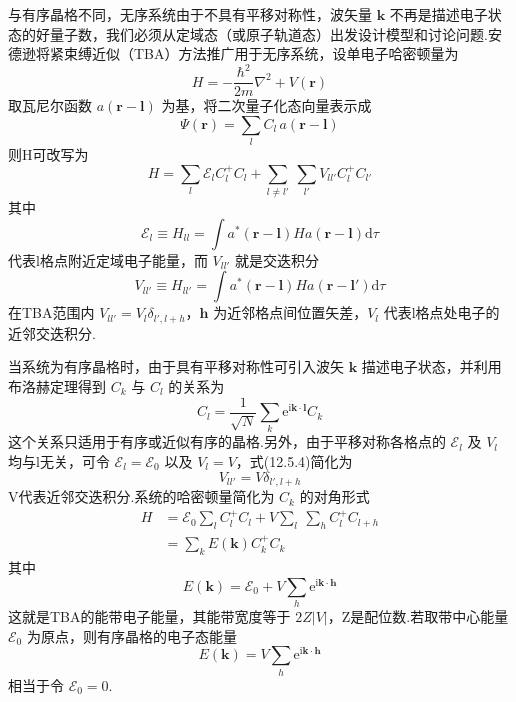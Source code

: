 与有序晶格不同，无序系统由于不具有平移对称性，波矢量 $\boldsymbol{k}$ 不再是描述电子状态的好量子数，我们必须从定域态（或原子轨道态）出发设计模型和讨论问题.安德逊将紧束缚近似（TBA）方法推广用于无序系统，设单电子哈密顿量为
\begin{equation}
  H=-\frac{\hbar^{2}}{2m}\nabla^{2}+V\left(\boldsymbol{r}\right)
\end{equation}
取瓦尼尔函数 $a\left(\boldsymbol{r}-\boldsymbol{l}\right)$ 为基，将二次量子化态向量表示成
\begin{equation*}
  \Psi\left(\boldsymbol{r}\right)=\sum_{l}C_{l}\,a\left(\boldsymbol{r}-\boldsymbol{l}\right)
\end{equation*}
则H可改写为
\begin{equation}
  H=\sum_{l}\mathscr{E}_{l}C_{l}^{+}C_{l}+\sum_{l\neq l'}\ \sum_{l'}V_{ll'}C_{l}^{+}C_{l'}
\end{equation}
其中
\begin{equation}
  \mathscr{E}_{l}\equiv H_{ll}=\int a^{*}\left(\boldsymbol{r}-\boldsymbol{l}\right)
  Ha\left(\boldsymbol{r}-\boldsymbol{l}\right)\mathrm{d}\tau
\end{equation}
代表l格点附近定域电子能量，而 $V_{ll'}$ 就是交迭积分
\begin{equation}
  V_{ll'}\equiv H_{ll'}=\int a^{*}\left(\boldsymbol{r}-\boldsymbol{l}\right)
  Ha\left(\boldsymbol{r}-\boldsymbol{l}'\right)\mathrm{d}\tau
\end{equation}
在TBA范围内 $V_{ll'}=V_{l}\delta_{l',l+h}$，$\boldsymbol{h}$ 为近邻格点间位置矢差，$V_{l}$ 代表l格点处电子的近邻交迭积分.

当系统为有序晶格时，由于具有平移对称性可引入波矢 $\boldsymbol{k}$ 描述电子状态，并利用布洛赫定理得到 $C_{k}$ 与 $C_{l}$ 的关系为
\begin{equation}
  C_{l}=\frac{1}{\sqrt{N}}\sum_{k}\mathrm{e}^{\mathrm{i}\boldsymbol{k}\cdot\boldsymbol{l}}C_{k}
\end{equation}
这个关系只适用于有序或近似有序的晶格.另外，由于平移对称各格点的 $\mathscr{E}_{l}$ 及 $V_{l}$ 均与l无关，可令 $\mathscr{E}_{l}=\mathscr{E}_{0}$ 以及 $V_{l}=V$，式(12.5.4)简化为
\begin{equation}
  V_{ll'}=V\delta_{l',l+h}
\end{equation}
V代表近邻交迭积分.系统的哈密顿量简化为 $C_{k}$ 的对角形式
\begin{equation}
\begin{aligned}
  H&=\mathscr{E}_{0}\sum_{l}C_{l}^{+}C_{l}
  +V\sum_{l}\ \sum_{h}C_{l}^{+}C_{l+h}\\
  &=\sum_{k}E\left(\boldsymbol{k}\right)C_{k}^{+}C_{k}
\end{aligned}
\end{equation}
其中
\begin{equation}
  E\left(\boldsymbol{k}\right)=\mathscr{E}_{0}+V\sum_{h}\mathrm{e}^{\mathrm{i}\boldsymbol{k}\cdot\boldsymbol{h}}
\end{equation}
这就是TBA的能带电子能量，其能带宽度等于 $2Z|V|$，Z是配位数.若取带中心能量 $\mathscr{E}_{0}$ 为原点，则有序晶格的电子态能量
\begin{equation}
  E\left(\boldsymbol{k}\right)=V\sum_{h}\mathrm{e}^{\mathrm{i}\boldsymbol{k}\cdot\boldsymbol{h}}
\end{equation}
相当于令 $\mathscr{E}_{0}=0$.

